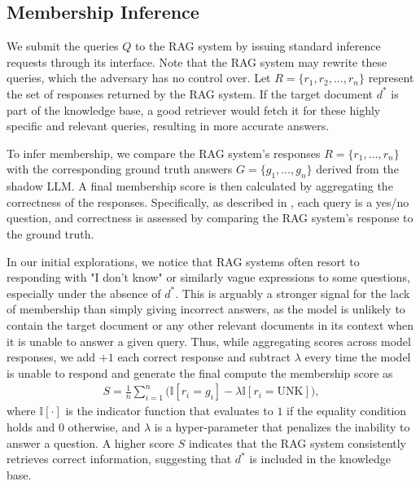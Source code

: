 \subsection{Membership Inference}
\label{sec:aggregation}

We submit the queries $Q$ to the RAG system by issuing standard inference requests through its interface. Note that the RAG system may rewrite these queries, which the adversary has no control over. Let $R=\{r_1, r_2, \ldots, r_n\}$ represent the set of responses returned by the RAG system. If the target document $d^*$ is part of the knowledge base, a good retriever would fetch it for these highly specific and relevant queries, resulting in more accurate answers.

To infer membership, we compare the RAG system's responses $R=\{r_1, \ldots, r_n\}$ with the corresponding ground truth answers $G=\{g_1, \ldots, g_n\}$ derived from the shadow LLM. A final membership score is then calculated by aggregating the correctness of the responses. Specifically, as described in , each query is a yes/no question, and correctness is assessed by comparing the RAG system’s response to the ground truth.

In our initial explorations, we notice that RAG systems often resort to responding with  "I don't know" or similarly vague expressions to some questions, especially under the absence of $d^*$. This is arguably a stronger signal for the lack of membership than simply giving incorrect answers, as the model is unlikely to contain the target document or any other relevant documents in its context when it is unable to answer a given query. Thus, while aggregating scores across model responses, we add $+1$ each correct response and subtract $\lambda$ every time the model is unable to respond and generate the final compute the membership score as
\begin{align}
S = \frac{1}{n} \sum_{i=1}^{n} \big(\mathbb{I}[r_i = g_i] - \lambda \mathbb{I}[r_i = \text{UNK}]\big),
\end{align}
where $\mathbb{I}[\cdot]$ is the indicator function that evaluates to $1$ if the equality condition holds and $0$ otherwise, and $\lambda$ is a hyper-parameter that penalizes the inability to answer a question.
A higher score $S$ indicates that the RAG system consistently retrieves correct information, suggesting that $d^*$ is included in the knowledge base.


